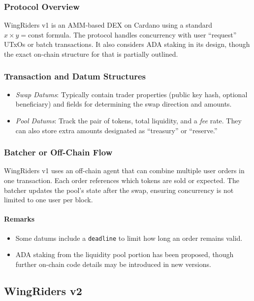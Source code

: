 \documentclass{article}
\begin{document}
\subsubsection{Protocol Overview}
WingRiders v1 is an AMM-based DEX on Cardano using a standard \( x \times y = \text{const} \) formula. The protocol handles concurrency with user ``request'' UTxOs or batch transactions. It also considers ADA staking in its design, though the exact on-chain structure for that is partially outlined.

\subsubsection{Transaction and Datum Structures}
\begin{itemize}
    \item \emph{Swap Datums}: Typically contain trader properties (public key hash, optional beneficiary) and fields for determining the swap direction and amounts.
    \item \emph{Pool Datums}: Track the pair of tokens, total liquidity, and a \textit{fee} rate. They can also store extra amounts designated as ``treasury'' or ``reserve.''
\end{itemize}

\subsubsection{Batcher or Off-Chain Flow}
WingRiders v1 uses an off-chain agent that can combine multiple user orders in one transaction. Each order references which tokens are sold or expected. The batcher updates the pool’s state after the swap, ensuring concurrency is not limited to one user per block.

\paragraph{Remarks}
\begin{itemize}
    \item Some datums include a \texttt{deadline} to limit how long an order remains valid.
    \item ADA staking from the liquidity pool portion has been proposed, though further on-chain code details may be introduced in new versions.
\end{itemize}



\subsection{WingRiders v2}
\label{sec:wingriders_v2}
\end{document}
